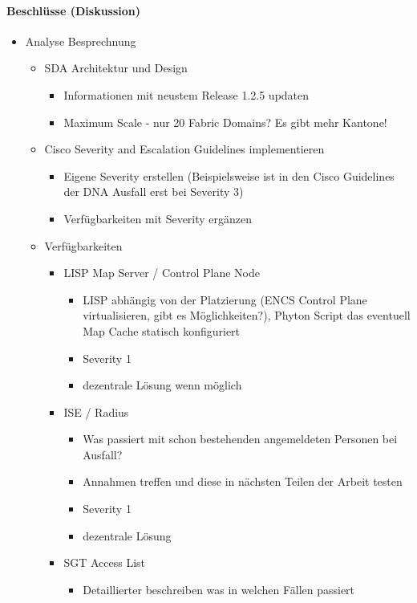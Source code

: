 \paragraph{Beschlüsse (Diskussion)}
\begin{itemize}
	\item Analyse Besprechnung
	\begin{itemize}
		\item SDA Architektur und Design
		\begin{itemize}
			\item Informationen mit neustem Release 1.2.5 updaten
			\item Maximum Scale - nur 20 Fabric Domains? Es gibt mehr Kantone!
		\end{itemize}
		\item Cisco Severity and Escalation Guidelines implementieren
		\begin{itemize}
			\item Eigene Severity erstellen (Beispielsweise ist in den Cisco Guidelines der DNA Ausfall erst bei Severity 3) 
			\item Verfügbarkeiten mit Severity ergänzen
		\end{itemize}
		\item Verfügbarkeiten
		\begin{itemize}
			\item LISP Map Server / Control Plane Node
			\begin{itemize}
				\item LISP abhängig von der Platzierung (ENCS Control Plane virtualisieren, gibt es Möglichkeiten?), Phyton Script das eventuell Map Cache statisch konfiguriert
				\item Severity 1
				\item dezentrale Lösung wenn möglich
			\end{itemize}
			\item ISE / Radius
			\begin{itemize}
				\item Was passiert mit schon bestehenden angemeldeten Personen bei Ausfall?
				\item Annahmen treffen und diese in nächsten Teilen der Arbeit testen
				\item Severity 1
				\item dezentrale Lösung
			\end{itemize}
			\item SGT Access List
			\begin{itemize}
				\item Detaillierter beschreiben was in welchen Fällen passiert

\end{itemize}
\end{itemize}
\end{itemize}
\end{itemize}
